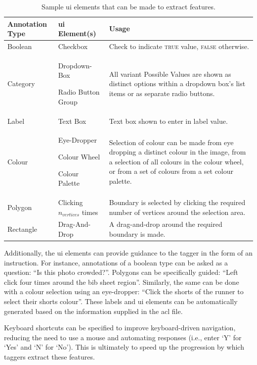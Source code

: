 \begin{table}
  \centering
  \caption[Sample UI elements to extract features in Argus]{Sample \gls{ui} elements that can be made to extract features.}
  \label{tab:dataset:process:ui_elements}
    \begin{tabular}{lp{}p{}}
    \toprule
      \bfseries Annotation Type &
      \bfseries \gls{ui} Element(s) &
      \bfseries Usage
    \\
    \midrule
      Boolean &
      Checkbox &
      Check to indicate \textsc{true} value, \textsc{false} otherwise.
    \\
      Category &
      { Dropdown-Box \par Radio Button Group } &
      All variant Possible Values are shown as distinct options within a dropdown box's list items or as separate radio buttons.
    \\
      Label &
      Text Box &
      Text box shown to enter in label value.
    \\
      Colour &
      { Eye-Dropper \par Colour Wheel \par Colour Palette } &
      Selection of colour can be made from eye dropping a distinct colour in the image, from a selection of all colours in the colour wheel, or from a set of colours from a set colour palette.
    \\
      Polygon &
      Clicking $n_{vertices}$ times &
      Boundary is selected by clicking the required number of vertices around the selection area.
    \\
      Rectangle &
      Drag-And-Drop &
      A drag-and-drop around the required boundary is made.
    \\
    \bottomrule
    \end{tabular}
\end{table}

Additionally, the \gls{ui} elements can provide guidance to the tagger in the form of an instruction. For instance, annotations of a boolean type can be asked as a question: ``Is this photo crowded?''. Polygons can be specifically guided: ``Left click four times around the bib sheet region''. Similarly, the same can be done with a colour selection using an eye-dropper: ``Click the shorts of the runner to select their shorts colour''. These labels and \gls{ui} elements can be automatically generated based on the information supplied in the \gls{acl} file.

Keyboard shortcuts can be specified to improve keyboard-driven navigation, reducing the need to use a mouse and automating responses (i.e., enter `Y' for `Yes' and `N' for `No'). This is ultimately to speed up the progression by which taggers extract these features.

